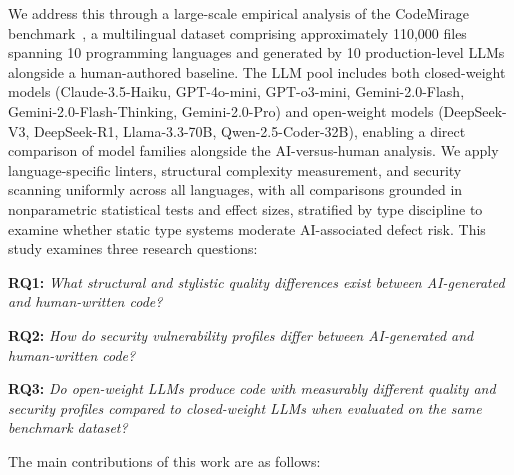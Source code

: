 We address this through a large-scale empirical analysis of the CodeMirage benchmark~\cite{codemirage2024}, a multilingual dataset comprising approximately 110,000 files spanning 10 programming languages and generated by 10 production-level LLMs alongside a human-authored baseline. The LLM pool includes both closed-weight models (Claude-3.5-Haiku, GPT-4o-mini, GPT-o3-mini, Gemini-2.0-Flash, Gemini-2.0-Flash-Thinking, Gemini-2.0-Pro) and open-weight models (DeepSeek-V3, DeepSeek-R1, Llama-3.3-70B, Qwen-2.5-Coder-32B), enabling a direct comparison of model families alongside the AI-versus-human analysis. We apply language-specific linters, structural complexity measurement, and security scanning uniformly across all languages, with all comparisons grounded in nonparametric statistical tests and effect sizes, stratified by type discipline to examine whether static type systems moderate AI-associated defect risk. This study examines three research questions:

\vspace{0.4em}
\noindent \textbf{RQ1:} \textit{What structural and stylistic quality differences exist between AI-generated and human-written code?}

\vspace{0.2em}
\noindent \textbf{RQ2:} \textit{How do security vulnerability profiles differ between AI-generated and human-written code?}

\vspace{0.2em}
\noindent \textbf{RQ3:} \textit{Do open-weight LLMs produce code with measurably different quality and security profiles compared to closed-weight LLMs when evaluated on the same benchmark dataset?}
\vspace{0.4em}

\noindent The main contributions of this work are as follows:

